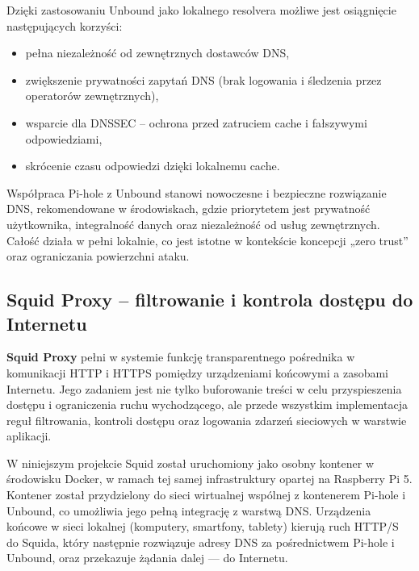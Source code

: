 \documentclass[
    left=2.5cm,         %
    right=2.5cm,        %
    top=2.5cm,          %
    bottom=3cm,         %
    bindingoffset=6mm,  %
    nohyphenation=true %
]{eiti/eiti-thesis} %
\begin{document}
Dzięki zastosowaniu Unbound jako lokalnego resolvera możliwe jest osiągnięcie następujących korzyści:
\begin{itemize}
    \item pełna niezależność od zewnętrznych dostawców DNS,
    \item zwiększenie prywatności zapytań DNS (brak logowania i śledzenia przez operatorów zewnętrznych),
    \item wsparcie dla DNSSEC – ochrona przed zatruciem cache i fałszywymi odpowiedziami,
    \item skrócenie czasu odpowiedzi dzięki lokalnemu cache.
\end{itemize}

Współpraca Pi-hole z Unbound stanowi nowoczesne i bezpieczne rozwiązanie DNS, rekomendowane w środowiskach, gdzie priorytetem jest prywatność użytkownika, integralność danych oraz niezależność od usług zewnętrznych. Całość działa w pełni lokalnie, co jest istotne w kontekście koncepcji „zero trust” oraz ograniczania powierzchni ataku.

\subsection{Squid Proxy – filtrowanie i kontrola dostępu do Internetu}

\textbf{Squid Proxy}\cite{squid-docs} pełni w systemie funkcję transparentnego pośrednika w komunikacji HTTP i HTTPS pomiędzy urządzeniami końcowymi a zasobami Internetu. Jego zadaniem jest nie tylko buforowanie treści w celu przyspieszenia dostępu i ograniczenia ruchu wychodzącego, ale przede wszystkim implementacja reguł filtrowania, kontroli dostępu oraz logowania zdarzeń sieciowych w warstwie aplikacji.

W niniejszym projekcie Squid został uruchomiony jako osobny kontener w środowisku Docker, w ramach tej samej infrastruktury opartej na Raspberry Pi 5. Kontener został przydzielony do sieci wirtualnej wspólnej z kontenerem Pi-hole i Unbound, co umożliwia jego pełną integrację z warstwą DNS\cite{config-squid}. Urządzenia końcowe w sieci lokalnej (komputery, smartfony, tablety) kierują ruch HTTP/S do Squida, który następnie rozwiązuje adresy DNS za pośrednictwem Pi-hole i Unbound, oraz przekazuje żądania dalej — do Internetu.
\end{document}
